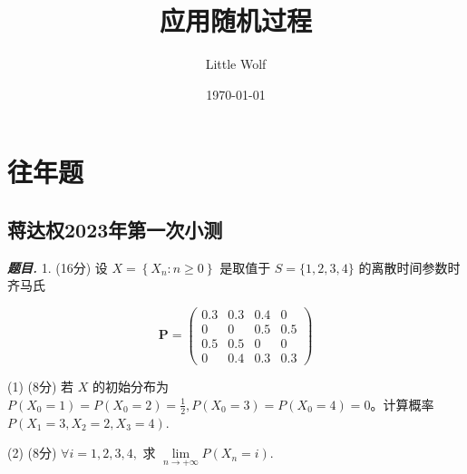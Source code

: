 \documentclass[10pt, a4paper, oneside]{ctexart}
\title{\textbf{应用随机过程}}
\author{Little Wolf}
\date{\today}
\newenvironment{problem}{\begin{framed}\par\noindent\textbf{\textit{题目. }}}{\end{framed}\par}
\begin{document}
\maketitle

\tableofcontents
\newpage

\section{往年题}
\subsection{蒋达权2023年第一次小测}
\begin{problem}
    1. (16分) 设 \( X = \left\{  {{X}_{n} : n \geq  0}\right\}   \) 是取值于 \( S = \{ 1,2,3,4\}  \) 的离散时间参数时齐马氏

\[\mathbf{P} = \left( \begin{matrix} {0.3} & {0.3} & {0.4} & 0 \\  0 & 0 & {0.5} & {0.5} \\  {0.5} & {0.5} & 0 & 0 \\  0 & {0.4} & {0.3} & {0.3} \end{matrix}\right) \]

(1) (8分) 若 \( X \) 的初始分布为 \( P\left( {{X}_{0} = 1}\right)  = P\left( {{X}_{0} = 2}\right)  = \frac{1}{2},P\left( {{X}_{0} = 3}\right)  = P\left(X_0=4\right)=0 \)。计算概率$P(X_1=3,X_2=2,X_3=4)$.

(2) (8分) \( \forall i = 1,2,3,4, \) 求 \( \mathop{\lim }\limits_{{n \rightarrow   + \infty }}P\left( {{X}_{n} = i}\right)  \).
\end{problem}
\end{document}
